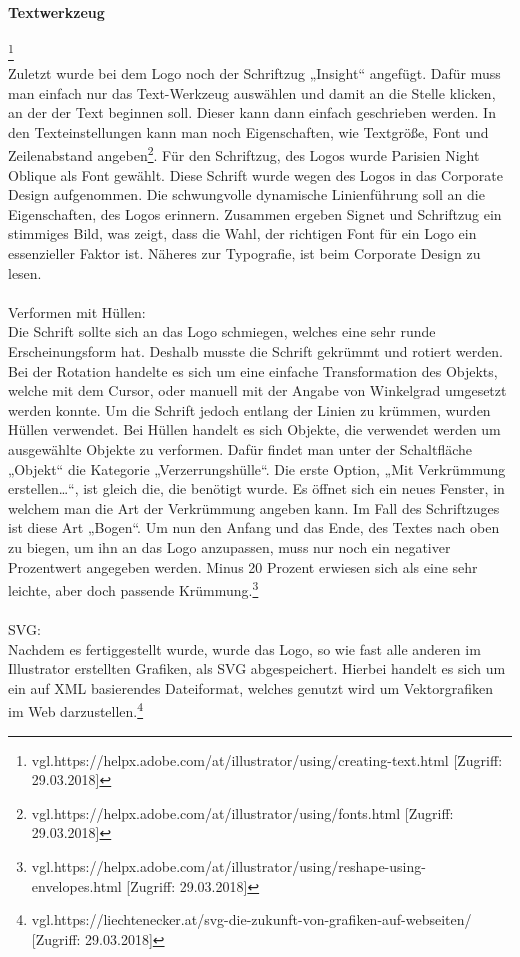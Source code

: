 \paragraph{Textwerkzeug}\footnote{\label{} vgl.https://helpx.adobe.com/at/illustrator/using/creating-text.html [Zugriff: 29.03.2018]}
\leavevmode \\
Zuletzt wurde bei dem Logo noch der Schriftzug „Insight“ angefügt. Dafür muss man einfach nur das Text-Werkzeug auswählen und damit an die Stelle klicken, an der der Text beginnen soll. Dieser kann dann einfach geschrieben werden. In den Texteinstellungen kann man noch Eigenschaften, wie Textgröße, Font und Zeilenabstand angeben\footnote{\label{} vgl.https://helpx.adobe.com/at/illustrator/using/fonts.html [Zugriff: 29.03.2018]}.
Für den Schriftzug, des Logos wurde Parisien Night Oblique als Font gewählt. Diese Schrift wurde wegen des Logos in das Corporate Design aufgenommen. Die schwungvolle dynamische Linienführung soll an die Eigenschaften, des Logos erinnern. Zusammen ergeben Signet und Schriftzug ein stimmiges Bild, was zeigt, dass die Wahl, der richtigen Font für ein Logo ein essenzieller Faktor ist. Näheres zur Typografie, ist beim Corporate Design zu lesen.
\leavevmode \\
\leavevmode \\
Verformen mit Hüllen:
\leavevmode \\
Die Schrift sollte sich an das Logo schmiegen, welches eine sehr runde Erscheinungsform hat. Deshalb musste die Schrift gekrümmt und rotiert werden. Bei der Rotation handelte es sich um eine einfache Transformation des Objekts, welche mit dem Cursor, oder manuell mit der Angabe von Winkelgrad umgesetzt werden konnte. Um die Schrift jedoch entlang der Linien zu krümmen, wurden Hüllen verwendet. Bei Hüllen handelt es sich Objekte, die verwendet werden um ausgewählte Objekte zu verformen. Dafür findet man unter der Schaltfläche „Objekt“ die Kategorie „Verzerrungshülle“. Die erste Option, „Mit Verkrümmung erstellen…“, ist gleich die, die benötigt wurde. Es öffnet sich ein neues Fenster, in welchem man die Art der Verkrümmung angeben kann. Im Fall des Schriftzuges ist diese Art „Bogen“. Um nun den Anfang und das Ende, des Textes nach oben zu biegen, um ihn an das Logo anzupassen, muss nur noch ein negativer Prozentwert angegeben werden. Minus 20 Prozent erwiesen sich als eine sehr leichte, aber doch passende Krümmung.\footnote{\label{} vgl.https://helpx.adobe.com/at/illustrator/using/reshape-using-envelopes.html [Zugriff: 29.03.2018]}
\leavevmode \\
\leavevmode \\
SVG:
\leavevmode \\
Nachdem es fertiggestellt wurde, wurde das Logo, so wie fast alle anderen im Illustrator erstellten Grafiken, als SVG abgespeichert. Hierbei handelt es sich um ein auf XML basierendes Dateiformat, welches genutzt wird um Vektorgrafiken im Web darzustellen.\footnote{\label{} vgl.https://liechtenecker.at/svg-die-zukunft-von-grafiken-auf-webseiten/ [Zugriff: 29.03.2018]}

